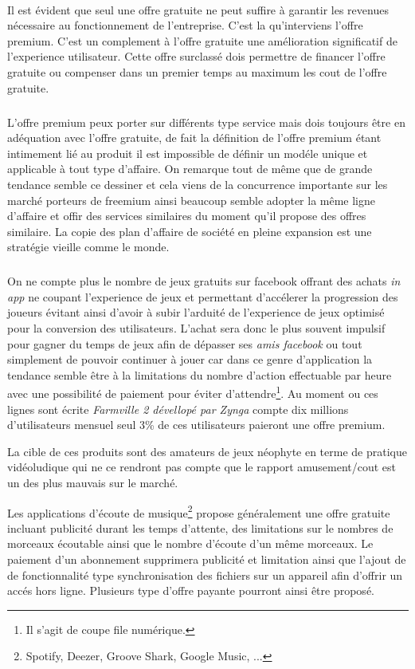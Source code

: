 \documentclass[11pt, a4paper ]{article}
\begin{document}
\begin{spacing}{1.5}
\paragraph{} %
Il est évident que seul une offre gratuite ne peut suffire à garantir les revenues nécessaire au fonctionnement de l'entreprise. C'est la qu'interviens l'offre premium. C'est un complement à l'offre gratuite une amélioration significatif de l'experience utilisateur. Cette offre surclassé dois permettre de financer l'offre gratuite ou compenser dans un premier temps au maximum les cout de l'offre gratuite.
\subparagraph{}
L'offre premium peux porter sur différents type service mais dois toujours être en adéquation avec l'offre gratuite, de fait la définition de l'offre premium étant intimement lié au produit il est impossible de définir un modéle unique et applicable à tout type d'affaire. On remarque tout de même que de grande tendance semble ce dessiner et cela viens de la concurrence importante sur les marché porteurs de freemium ainsi beaucoup semble adopter la même ligne d'affaire et offir des services similaires du moment qu'il propose des offres similaire. La copie des plan d'affaire de société en pleine expansion est une stratégie vieille comme le monde.

\subparagraph{} %

On ne compte plus le nombre de jeux gratuits sur facebook offrant des achats \emph{in app} ne coupant l'experience de jeux et permettant d'accélerer la progression des joueurs évitant ainsi d'avoir à subir l'arduité de l'experience de jeux optimisé pour la conversion des utilisateurs. L'achat sera donc le plus souvent impulsif pour gagner du temps de jeux afin de dépasser ses \emph{amis facebook} ou tout simplement de pouvoir continuer à jouer car dans ce genre d'application la tendance semble être à la limitations du nombre d'action effectuable par heure avec une possibilité de paiement pour éviter d'attendre\footnote{Il s'agit de coupe file numérique.}. Au moment ou ces lignes sont écrite \emph{Farmville 2 dévellopé par Zynga} compte dix millions d'utilisateurs mensuel seul 3\% de ces utilisateurs paieront une offre premium.


La cible de ces produits sont des amateurs de jeux néophyte en terme de pratique vidéoludique qui ne ce rendront pas compte que le rapport amusement/cout est un des plus mauvais sur le marché.

\subsubparagraph{}
Les applications d'écoute de musique\footnote{Spotify, Deezer, Groove Shark, Google Music, ...} propose généralement une offre gratuite incluant publicité durant les temps d'attente, des limitations sur le nombres de morceaux écoutable ainsi que le nombre d'écoute d'un même morceaux.
Le paiement d'un abonnement supprimera publicité et limitation ainsi que l'ajout de de fonctionnalité type synchronisation des fichiers sur un appareil afin d'offrir un accés hors ligne. Plusieurs type d'offre payante pourront ainsi être proposé.


\end{spacing}
\end{document}
